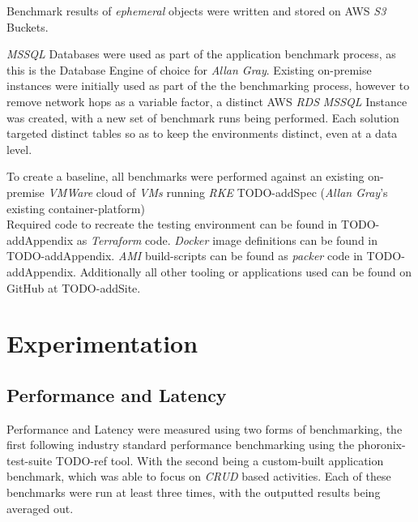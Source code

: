 Benchmark results of \emph{ephemeral} objects were written and stored on AWS \emph{S3} Buckets.

\emph{MSSQL} Databases were used as part of the application benchmark process, as this is the Database Engine of choice for \emph{Allan Gray}.
Existing on-premise instances were initially used as part of the the benchmarking process, however to remove network hops as a variable factor,
a distinct AWS \emph{RDS} \emph{MSSQL} Instance was created, with a new set of benchmark runs being performed.
Each solution targeted distinct tables so as to keep the environments distinct, even at a data level.

To create a baseline, all benchmarks were performed against an existing on-premise \emph{VMWare} cloud of \emph{VMs} running \emph{RKE} TODO-addSpec (\emph{Allan Gray}'s existing container-platform) \\

\noindent Required code to recreate the testing environment can be found in TODO-addAppendix as \emph{Terraform} code.
\emph{Docker} image definitions can be found in TODO-addAppendix.
\emph{AMI} build-scripts can be found as \emph{packer} code in TODO-addAppendix.
Additionally all other tooling or applications used can be found on GitHub at TODO-addSite.

\chapter{Experimentation}
\section{Performance and Latency}
Performance and Latency were measured using two forms of benchmarking, the first following industry standard performance benchmarking using the phoronix-test-suite TODO-ref tool.
With the second being a custom-built application benchmark, which was able to focus on \emph{CRUD} based activities.
Each of these benchmarks were run at least three times, with the outputted results being averaged out.

